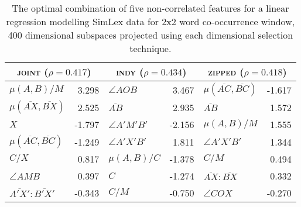 
\begin{table}
\centering
\begin{tabular}{lr|lr|lr}
\hline
\multicolumn{2}{c}{\textsc{joint} ($\rho = 0.417$)} & \multicolumn{2}{c}{\textsc{indy} ($\rho = 0.434$)} & \multicolumn{2}{c}{\textsc{zipped} ($\rho = 0.418$)} \\
\hline
$\mu(A,B)/M$ & 3.298 & $\angle AOB$ & 3.467 & $\mu(\overline{AC},\overline{BC})$ & -1.617 \\
$\mu(\overline{AX},\overline{BX})$ & 2.525 & $\overline{AB}$ & 2.935 & $\overline{AB}$ & 1.572 \\
$X$ & -1.797 & $\angle A'M'B'$ & -2.156 & $\mu(A,B)/M$ & 1.555 \\
$\mu(\overline{AC},\overline{BC})$ & -1.249 & $\angle A'X'B'$ & 1.811 & $\angle A'X'B'$ & 1.344 \\
$C/X$ & 0.817 & $\mu(A,B)/C$ & -1.378 & $C/M$ & 0.494 \\
$\angle AMB$ & 0.397 & $C$ & -1.274 & $\overline{AX}:\overline{BX}$ & 0.332 \\
$\overline{A'X'}:\overline{B'X'}$ & -0.343 & $C/M$ & -0.750 & $\angle COX$ & -0.270 \\
\hline
\end{tabular}
\caption{The optimal combination of five non-correlated features for a linear regression modelling SimLex data for 2x2 word co-occurrence window, 400 dimensional subspaces projected using each dimensional selection technique.}
\label{tab:fivelated}
\end{table}

